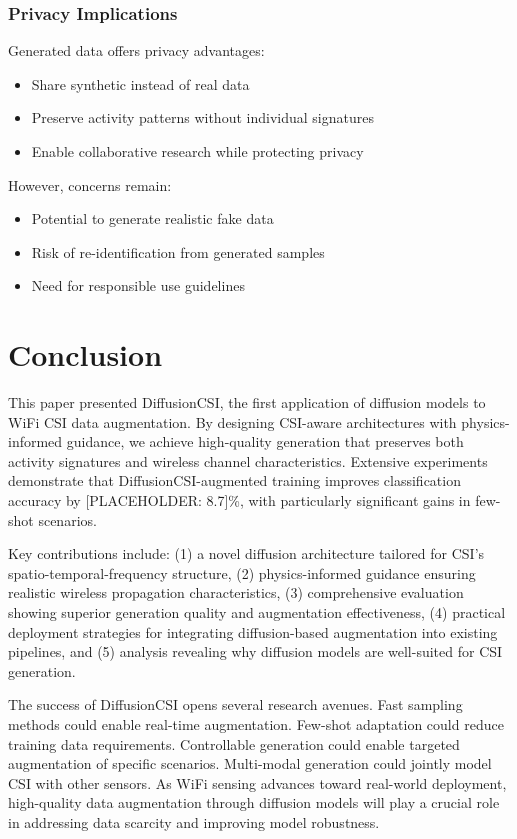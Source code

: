 \documentclass[journal]{IEEEtran}
\begin{document}
\subsubsection{Privacy Implications}
Generated data offers privacy advantages:
\begin{itemize}
\item Share synthetic instead of real data
\item Preserve activity patterns without individual signatures
\item Enable collaborative research while protecting privacy
\end{itemize}

However, concerns remain:
\begin{itemize}
\item Potential to generate realistic fake data
\item Risk of re-identification from generated samples
\item Need for responsible use guidelines
\end{itemize}

\section{Conclusion}

This paper presented DiffusionCSI, the first application of diffusion models to WiFi CSI data augmentation. By designing CSI-aware architectures with physics-informed guidance, we achieve high-quality generation that preserves both activity signatures and wireless channel characteristics. Extensive experiments demonstrate that DiffusionCSI-augmented training improves classification accuracy by [PLACEHOLDER: 8.7]\%, with particularly significant gains in few-shot scenarios.

Key contributions include: (1) a novel diffusion architecture tailored for CSI's spatio-temporal-frequency structure, (2) physics-informed guidance ensuring realistic wireless propagation characteristics, (3) comprehensive evaluation showing superior generation quality and augmentation effectiveness, (4) practical deployment strategies for integrating diffusion-based augmentation into existing pipelines, and (5) analysis revealing why diffusion models are well-suited for CSI generation.

The success of DiffusionCSI opens several research avenues. Fast sampling methods could enable real-time augmentation. Few-shot adaptation could reduce training data requirements. Controllable generation could enable targeted augmentation of specific scenarios. Multi-modal generation could jointly model CSI with other sensors. As WiFi sensing advances toward real-world deployment, high-quality data augmentation through diffusion models will play a crucial role in addressing data scarcity and improving model robustness.



\end{document}
